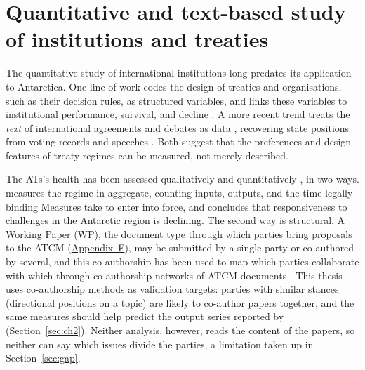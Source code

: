 \section{Quantitative and text-based study of institutions and treaties}
\label{sec:computational}

The quantitative study of international institutions long predates its application to
Antarctica. One line of work codes the design of treaties and organisations, such as their
decision rules, as structured variables, and links these variables to institutional performance,
survival, and decline \parencite{Gray2018}. A more recent trend treats the \emph{text} of
international agreements and debates as data \parencite{Grimmer2013}, recovering state positions
from voting records and speeches \parencite{Baturo2017,Slapin2008}. Both suggest that the
preferences and design features of treaty regimes can be measured, not merely described.

The ATs's health has been assessed qualitatively \parencite{Mancilla2023} and quantitatively \parencite{Gardiner2025,Botelho_CoalitionDynamics,Kumar_ConsistentPatterns}, in
two ways. \textcite{Gardiner2025} measures the regime in aggregate, counting inputs, outputs, and
the time legally binding Measures take to enter into force, and concludes that responsiveness to
challenges in the Antarctic region is declining. The second way is structural. A Working Paper
(WP), the document type through which parties bring proposals to the ATCM (\hyperref[app:f]{Appendix~F}), may be
submitted by a single party or co-authored by several, and this co-authorship has been used to
map which parties collaborate with which through co-authorship networks of ATCM documents
\parencite{Botelho_CoalitionDynamics,Kumar_ConsistentPatterns}.
This thesis uses co-authorship methods as validation targets: parties with similar stances
(directional positions on a topic) are likely to co-author papers together, and the same measures should help predict the output series
reported by \textcite{Gardiner2025} (Section~\ref{sec:ch2}).
Neither analysis, however, reads the content of the papers, so neither can say which issues
divide the parties, a limitation taken up in Section~\ref{sec:gap}.

